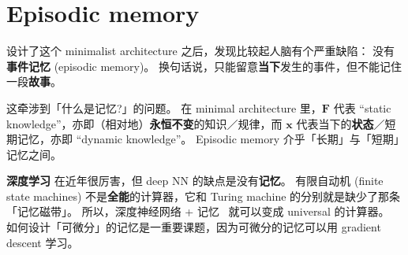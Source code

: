 \documentclass[orivec]{llncs}
\newcommand{\emp}[1]{\textbf{\textcolor{Cerulean}{#1}}}
\newcommand{\vect}[1]{\boldsymbol{#1}}
\begin{document}

\section{Episodic memory}

设计了这个 minimalist architecture 之后，发现比较起人脑有个严重缺陷： 没有 \emp{事件记忆} (episodic memory)。 换句话说，只能留意\textbf{当下}发生的事件，但不能记住一段\textbf{故事}。

这牵涉到「什么是记忆?」的问题。 在 minimal architecture 里，$\vect{F}$ 代表 ``static knowledge''，亦即（相对地）\textbf{永恒不变}的知识／规律，而 $\vect{x}$ 代表当下的\textbf{状态}／短期记忆，亦即 ``dynamic knowledge''。  Episodic memory 介乎「长期」与「短期」记忆之间。

\textbf{深度学习} 在近年很厉害，但 deep NN 的缺点是没有\textbf{记忆}。 有限自动机 (finite state machines) 不是\textbf{全能}的计算器，它和 Turing machine 的分别就是缺少了那条「记忆磁带」。 所以，深度神经网络 + 记忆~ 就可以变成 universal 的计算器。 如何设计「可微分」的记忆是一重要课题，因为可微分的记忆可以用 gradient descent 学习。 
\end{document}
